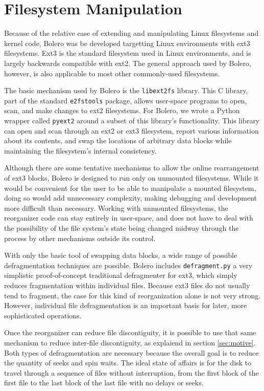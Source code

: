 \documentclass[10pt,twocolumn,letterpaper]{article}
\begin{document}
\section{Filesystem Manipulation}

Because of the relative ease of extending and manipulating Linux filesystems and
kernel code, Bolero was be developed targetting Linux environments with ext3
filesystems. Ext3 is the standard filesystem used in Linux
environments, and is largely backwards compatible with ext2\cite{ext2journal}.
The general approach used by Bolero, however, is also applicable to most other commonly-used
filesystems.

The basic mechanism used by Bolero is the \texttt{libext2fs} library. This C
library, part of the standard \texttt{e2fstools} package, allows user-space programs
to open, scan, and make changes to ext2 filesystems. For Bolero, we wrote
a Python wrapper called \texttt{pyext2} around a subset of this library's functionality.
This library can open and scan through an ext2 or ext3 filesystem, report
various information about its contents, and swap the locations of arbitrary data
blocks while maintaining the filesystem's internal consistency.

Although there are some tentative mechanisms to allow the online rearrangement
of ext3 blocks\cite{ext3online}, Bolero is designed to run only on unmounted filesystems.
While it would be
convenient for the user to be able to manipulate a mounted filesystem, doing so
would add unnecessary complexity, making debugging and
development more difficult than necessary. Working with unmounted filesystems,
the reorganizer code can stay entirely in user-space, and does not have
to deal with the possibility of the file system's state being changed
midway through the process by other mechanisms outside its control.

With only the basic tool of swapping data blocks, a wide range of possible
defragmentation techniques are possible. Bolero includes \texttt{defragment.py}
a very simplistic proof-of-concept traditional defragmenter for ext3, which
simply reduces fragmentation within individual files. Because ext3 files do
not usually tend to fragment, the case for this kind of reorganization alone
is not very strong. However, individual file defragmentation is an important
basis for later, more sophisticated operations.

Once the reorganizer can reduce file discontiguity, it is possible to
use that same mechanism to reduce inter-file discontiguity, as explaiend
in section \ref{sec:motive}. Both types of defragmentation are necessary because the overall goal is to reduce the quantity of seeks and spin waits. The ideal state of affairs is for the disk to travel through
a sequence of files without interruption\cite{autolocality}, from the first block of the first file to the last
block of the last file with no delays or seeks.
\end{document}
